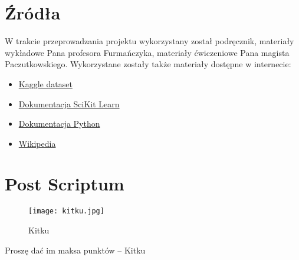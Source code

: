 \documentclass{article}
\begin{document}
\section{Źródła}
 W trakcie przeprowadzania projektu wykorzystany został podręcznik, materiały wykładowe Pana profesora Furmańczyka, materiały ćwiczeniowe Pana magista Paczutkowskiego. Wykorzystane zostały także materiały dostępne w internecie:
 \begin{itemize}
     \item \href{https://www.kaggle.com/datasets/fedesoriano/stellar-classification-dataset-sdss17}{Kaggle dataset}
     \item \href{https://scikit-learn.org/stable/user_guide.html}{Dokumentacja SciKit Learn}
     \item \href{https://docs.python.org/3/}{Dokumentacja Python}
     \item \href{https://en.wikipedia.org/wiki/Main_Page}{Wikipedia}
 \end{itemize}
\newpage
 \section{Post Scriptum}
 \begin{figure}[H]
     \centering
     \texttt{[image: kitku.jpg]}
     \caption{Kitku}
     \label{fig:enter-label}
 \end{figure}
 Proszę dać im maksa punktów -- Kitku
 
\end{document}
